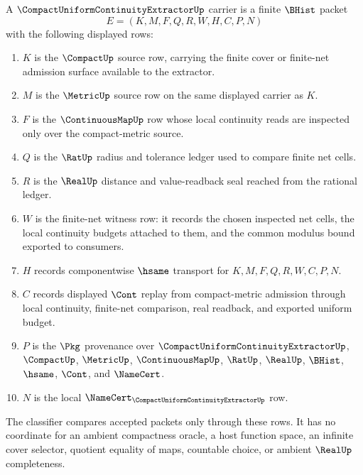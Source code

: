 \begin{definition}
\label{def:compact-uniform-continuity-extractor-carrier}
A $\CompactUniformContinuityExtractorUp$ carrier is a finite $\BHist$ packet
$$
E=(K,M,F,Q,R,W,H,C,P,N)
$$
with the following displayed rows:
\begin{enumerate}
\item $K$ is the $\CompactUp$ source row, carrying the finite cover or finite-net admission surface available to the extractor.
\item $M$ is the $\MetricUp$ source row on the same displayed carrier as $K$.
\item $F$ is the $\ContinuousMapUp$ row whose local continuity reads are inspected only over the compact-metric source.
\item $Q$ is the $\RatUp$ radius and tolerance ledger used to compare finite net cells.
\item $R$ is the $\RealUp$ distance and value-readback seal reached from the rational ledger.
\item $W$ is the finite-net witness row: it records the chosen inspected net cells, the local continuity budgets attached to them, and the common modulus bound exported to consumers.
\item $H$ records componentwise $\hsame$ transport for $K,M,F,Q,R,W,C,P,N$.
\item $C$ records displayed $\Cont$ replay from compact-metric admission through local continuity, finite-net comparison, real readback, and exported uniform budget.
\item $P$ is the $\Pkg$ provenance over $\CompactUniformContinuityExtractorUp$, $\CompactUp$, $\MetricUp$, $\ContinuousMapUp$, $\RatUp$, $\RealUp$, $\BHist$, $\hsame$, $\Cont$, and $\NameCert$.
\item $N$ is the local $\NameCert_{\CompactUniformContinuityExtractorUp}$ row.
\end{enumerate}
The classifier compares accepted packets only through these rows. It has no coordinate for an ambient compactness oracle, a host function space, an infinite cover selector, quotient equality of maps, countable choice, or ambient $\RealUp$ completeness.
\end{definition}

